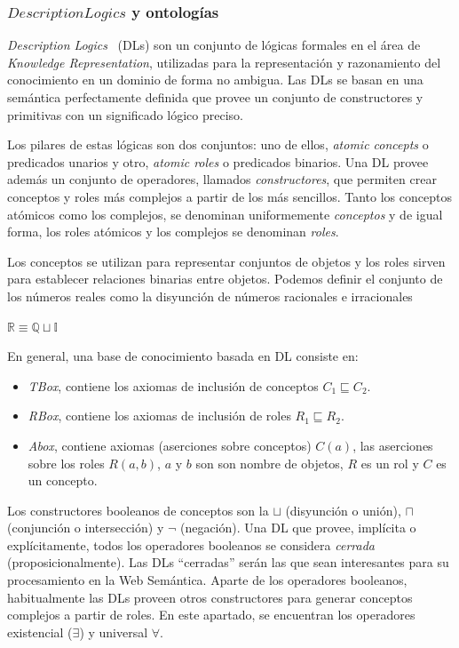 \subsubsection{$Description Logics$ y ontologías}
\textit{Description Logics}~\cite{baader03description} (\gls{DL}s) son un conjunto de lógicas
formales en el área de \textit{Knowledge Representation}, utilizadas para la representación y
razonamiento del conocimiento en un dominio de forma no ambigua. Las DLs se
basan en una semántica perfectamente definida que provee un conjunto de
constructores y primitivas con un significado lógico preciso.

Los pilares de estas lógicas son dos conjuntos: uno de ellos, \textit{atomic concepts}
o predicados unarios y otro, \textit{atomic roles} o predicados binarios. Una
DL provee además un conjunto de operadores, llamados \textit{constructores}, que
permiten crear conceptos y roles más complejos a partir de los más sencillos.
Tanto los conceptos atómicos como los complejos, se denominan uniformemente \textit{conceptos}
y de igual forma, los roles atómicos y los complejos se denominan
\textit{roles}.

Los conceptos se utilizan para representar conjuntos de objetos y los roles
sirven para establecer relaciones binarias entre objetos. Podemos definir el
conjunto de los números reales como la disyunción de
números racionales e irracionales
\begin{example}
$ \mathbb{R} \equiv \mathbb{Q} \sqcup \mathbb{I}$
\end{example}

En general, una base de conocimiento basada en DL consiste en:
\begin{itemize}
  \item \textit{TBox}, contiene los axiomas de inclusión de conceptos
  $C_1 \sqsubseteq C_2$.
  \item \textit{RBox}, contiene los axiomas de inclusión de roles $R_1 
  \sqsubseteq R_2$.
  \item \textit{Abox}, contiene axiomas (aserciones sobre conceptos) $C(a)$, las
  aserciones sobre los roles $R(a,b)$, $a$ y $b$ son son nombre de objetos, $R$
  es un rol y $C$ es un concepto.
\end{itemize}
 
Los constructores booleanos de conceptos son la $\sqcup$ (disyunción o unión),
$\sqcap$ (conjunción o intersección) y $\neg$ (negación). Una
DL que provee, implícita o explícitamente, todos los operadores booleanos se
considera \textit{cerrada} (proposicionalmente). Las DLs ``cerradas'' serán las
que sean interesantes para su procesamiento en la Web Semántica. Aparte de los
operadores booleanos, habitualmente las DLs proveen otros constructores para
generar conceptos complejos a partir de roles. En este apartado, se encuentran
los operadores existencial ($\exists$)  y universal $\forall$. 

